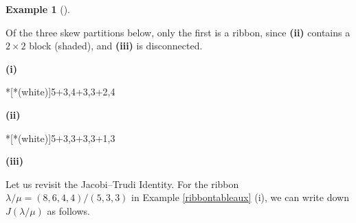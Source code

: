 \documentclass[numbers=enddot,12pt,final,onecolumn,notitlepage]{scrartcl}%
\theoremstyle{definition}
\newtheorem{exam}[theo]{Example}
\newenvironment{example}[1][]
{\begin{exam}[#1]\begin{leftbar}}
{\end{leftbar}\end{exam}}
\theoremstyle{plainsl}
\begin{document}





\begin{example}
\label{ribbontableaux}
Of the three skew partitions below, only the first is a ribbon, since \textbf{(ii)} contains a $2\times 2$ block (shaded), and \textbf{(iii)} is disconnected.

\begin{minipage}[t]{0.30\textwidth}
\begin{center}

\textbf{(i)}
\end{center}
\end{minipage}
\begin{minipage}[t]{0.30\textwidth}
\begin{center}
*[*(white)]{5+3,4+3,3+2,4}

\textbf{(ii)}
\end{center}
\end{minipage}
\begin{minipage}[t]{0.30\textwidth}
\begin{center}
*[*(white)]{5+3,3+3,3+1,3}

\textbf{(iii)}
\end{center}
\end{minipage}


\end{example}



Let us revisit the Jacobi--Trudi Identity. For the ribbon  $\lambda/\mu= (8,6,4,4)/(5,3,3)$ in Example \ref{ribbontableaux} (i), we can write down $J(\lambda/\mu)$ as follows. 
\end{document}
